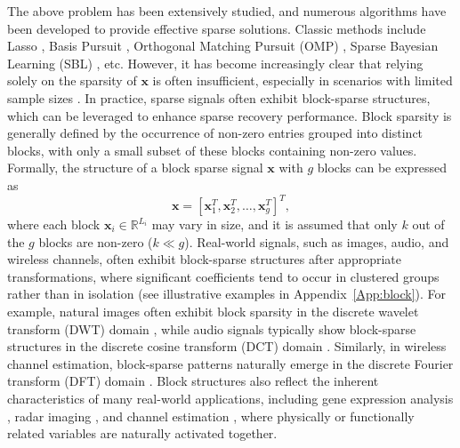\documentclass[lettersize,journal]{IEEEtran}
\theoremstyle{remark}
\newcommand{\blue}[1]{\textcolor{blue}{#1}}
\begin{document}
The above problem has been extensively studied, and numerous algorithms have been developed to provide effective sparse solutions. Classic methods include Lasso  \cite{tibshirani1996regression}, Basis Pursuit \cite{chen2001atomic}, Orthogonal Matching Pursuit (OMP) \cite{pati1993orthogonal}, Sparse Bayesian Learning (SBL) \cite{tipping2001sparse, ji2008bayesian}, etc. However, it has become increasingly clear that relying solely on the sparsity of \(\mathbf{x}\) is often insufficient, especially in scenarios with limited sample sizes \cite{eldar2010block,donoho2013accurate}. In practice, sparse signals often exhibit block-sparse structures, which can be leveraged to enhance sparse recovery performance. Block sparsity is generally defined by the occurrence of non-zero entries grouped into distinct blocks, with only a small subset of these blocks containing non-zero values. Formally, the structure of a block sparse signal \(\mathbf{x}\) with \(g\) blocks can be expressed as
\begin{equation}
	\mathbf{x} = [\mathbf{x}_1^T, \mathbf{x}_2^T, \ldots, \mathbf{x}_g^T]^T,
\end{equation}
where each block \(\mathbf{x}_i\in \mathbb{R}^{L_i}\) may vary in size, and it is assumed that only \(k\) out of the \(g\) blocks are non-zero (\(k \ll g\)).
 	Real-world signals, such as images, audio, and wireless channels, often exhibit block-sparse structures after appropriate transformations, where significant coefficients tend to occur in clustered groups rather than in isolation (see illustrative examples in Appendix~\ref{App:block}). 
 	 For example, natural images often exhibit block sparsity in the discrete wavelet transform (DWT) domain \cite{mishali2009blind, yu2012bayesian, he2009exploiting}, while audio signals typically show block-sparse structures in the discrete cosine transform (DCT) domain \cite{gribonval2003harmonic, NEURIPS2024_ead542f1}. Similarly, in wireless channel estimation, block-sparse patterns naturally emerge in the discrete Fourier transform (DFT) domain \cite{dai2018non}.
 	Block structures also reflect the inherent characteristics of many real-world applications, including gene expression analysis \cite{tibshirani2005sparsity}, radar imaging \cite{lv2014inverse}, and channel estimation \cite{srivastava2018quasi, wang2025near}, where physically or functionally related variables are naturally activated together.
\end{document}
